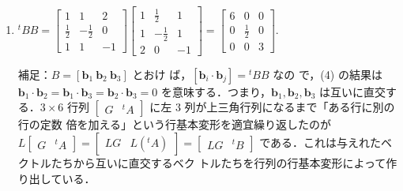 \documentclass[11pt, uplatex, dvipdfmx]{jsarticle}
\begin{document}
\begin{enumerate}
\begin{enumerate}[(1)]
  \item ${}^{t} B B = \left[
      \begin{array}{rrr}
        1 & 1 & 2\\
        \frac{1}{2} & -\frac{1}{2} & 0\\
        1 & 1 & -1
      \end{array}
    \right] \left[
      \begin{array}{rrr}
        1 & \frac{1}{2} & 1\\
        1 & -\frac{1}{2} & 1\\
        2 & 0 & -1
      \end{array}
    \right] = \left[
      \begin{array}{rrr}
        6 & 0 & 0\\
        0 & \frac{1}{2} & 0\\
        0 & 0 & 3
      \end{array}
    \right]$.

    \vspace{1zh}
    
    補足：$B=\left[ \bm{b}_1 \ \bm{b}_2 \ \bm{b}_3 \right]$ とおけ
    ば，$\left[ \bm{b}_i \cdot \bm{b}_j\right] = {}^{t}BB$ なの
    で，(4) の結果は
    $\bm{b}_1 \cdot \bm{b}_2 = \bm{b}_1 \cdot \bm{b}_3 = \bm{b}_2
    \cdot \bm{b}_3=0$ を意味する．つまり，$\bm{b}_1, \bm{b}_2,
    \bm{b}_3$
    は互いに直交する．$3 \times 6$ 行列 $\left[
      \begin{array}{cc}
        G & {}^{t}A
      \end{array}
    \right]$ に左 $3$ 列が上三角行列になるまで「ある行に別の行の定数
    倍を加える」という行基本変形を適宜繰り返したのが $L\left[
      \begin{array}{cc}
        G & {}^{t}A
      \end{array}
    \right] =\left[
      \begin{array}{cc}
        LG & L({}^{t}A)
      \end{array}
    \right] = \left[
      \begin{array}{cc}
        LG & {}^{t}B
      \end{array}
    \right]$ である．これは与えれたベクトルたちから互いに直交するベク
    トルたちを行列の行基本変形によって作り出している．
  \end{enumerate}
  
\end{enumerate}
\end{document}
